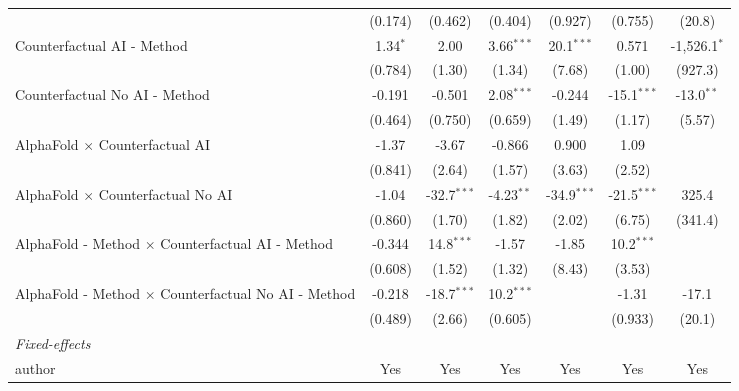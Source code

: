 \begin{tabular}{lcccccc}
                                                              & (0.174)      & (0.462)       & (0.404)      & (0.927)       & (0.755)       & (20.8)\\   
   Counterfactual AI - Method                                 & 1.34$^{*}$   & 2.00          & 3.66$^{***}$ & 20.1$^{***}$  & 0.571         & -1,526.1$^{*}$\\   
                                                              & (0.784)      & (1.30)        & (1.34)       & (7.68)        & (1.00)        & (927.3)\\   
   Counterfactual No AI - Method                              & -0.191       & -0.501        & 2.08$^{***}$ & -0.244        & -15.1$^{***}$ & -13.0$^{**}$\\   
                                                              & (0.464)      & (0.750)       & (0.659)      & (1.49)        & (1.17)        & (5.57)\\   
   AlphaFold $\times$ Counterfactual AI                       & -1.37        & -3.67         & -0.866       & 0.900         & 1.09          &   \\   
                                                              & (0.841)      & (2.64)        & (1.57)       & (3.63)        & (2.52)        &   \\   
   AlphaFold $\times$ Counterfactual No AI                    & -1.04        & -32.7$^{***}$ & -4.23$^{**}$ & -34.9$^{***}$ & -21.5$^{***}$ & 325.4\\   
                                                              & (0.860)      & (1.70)        & (1.82)       & (2.02)        & (6.75)        & (341.4)\\   
   AlphaFold - Method $\times$ Counterfactual AI - Method     & -0.344       & 14.8$^{***}$  & -1.57        & -1.85         & 10.2$^{***}$  &   \\   
                                                              & (0.608)      & (1.52)        & (1.32)       & (8.43)        & (3.53)        &   \\   
   AlphaFold - Method $\times$ Counterfactual No AI - Method  & -0.218       & -18.7$^{***}$ & 10.2$^{***}$ &               & -1.31         & -17.1\\   
                                                              & (0.489)      & (2.66)        & (0.605)      &               & (0.933)       & (20.1)\\   
   \midrule
   \emph{Fixed-effects}\\
   author                                                     & Yes          & Yes           & Yes          & Yes           & Yes           & Yes\\  

\end{tabular}
